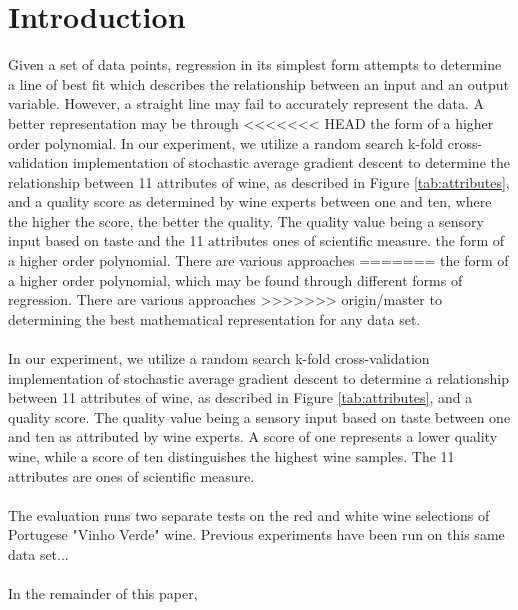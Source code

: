 
\section{Introduction}
\label{sec:intro}

Given a set of data points, regression in its simplest form attempts to 
determine a line of best fit which describes the relationship between an
input and an output variable. However, a straight line may fail to
accurately represent the data. A better representation may be through
<<<<<<< HEAD
the form of a higher order polynomial. In our experiment, we utilize
a random search k-fold cross-validation implementation of stochastic
average gradient descent to determine the relationship between 11 attributes of wine,
as described in Figure \ref{tab:attributes}, and a quality score as determined by wine experts
between one and ten, where the higher the score, the better the quality.
The quality value being a sensory input based on taste
and the 11 attributes ones of scientific measure.
the form of a higher order polynomial. There are various approaches 
=======
the form of a higher order polynomial, which may be found through different
forms of regression. There are various approaches 
>>>>>>> origin/master
to determining the best mathematical representation for any data set.
\\ \\
In our experiment, we utilize a random search k-fold cross-validation implementation of stochastic
average gradient descent to determine a relationship between 11 attributes of wine,
as described in Figure \ref{tab:attributes}, and a quality score. The quality value being a sensory input based on taste between one and ten as attributed by wine experts. A score of one represents a lower quality wine, while a score of ten distinguishes the highest wine samples. The 11 attributes are ones of scientific measure.
\\ \\
The evaluation runs two separate tests on the red and white wine 
selections of Portugese "Vinho Verde" wine. Previous experiments 
have been run on this same data set...
\\ \\
In the remainder of this paper, 




